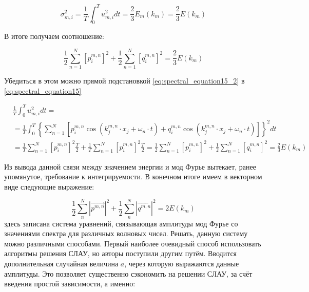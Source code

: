\begin{equation}
    \label{eq:spectral_equation15_2}
    \sigma^2_{m,i} = \frac{1}{T} \int_{0}^{T} u_{m,i}^2 dt = \frac{2}{3} E_m(k_m) = \frac{2}{3} E(k_m) 
\end{equation}

В итоге получаем соотношение:

\begin{equation}
    \label{eq:spectral_equation15_3}
    \frac{1}{2} \sum_{n=1}^N \left[ p_i^{m,n} \right]^2 + \frac{1}{2} \sum_{n=1}^N \left[ q_i^{m,n} \right]^2 = \frac{2}{3} E(k_m) 
\end{equation}

Убедиться в этом можно прямой подстановкой \eqref{eq:spectral_equation15_2} в \eqref{eq:spectral_equation15}

\begin{align}
    & \frac{1}{T} \int_{0}^{T} u_{m,i}^2 dt = \nonumber \\ 
    & = \frac{1}{T} \int_{0}^{T} \left\{ \sum_{n = 1}^{N} \left[ p_{i}^{m,n} \cos{(k_j^{m,n} \cdot x_j + \omega_n \cdot t)} + q_{i}^{m,n} \cos{(k_j^{m,n} \cdot x_j + \omega_n \cdot t)}\right]  \right\}^2 dt                                                                          \nonumber \\
    & = \frac{1}{T} \sum_{n = 1}^{N} \left[p_i^{m,n}\right]^2 \frac{T}{2} + \frac{1}{T} \sum_{n = 1}^{N} \left[p_i^{m,n}\right]^2 \frac{T}{2} = \frac{1}{2} \sum_{n=1}^N \left[ p_i^{m,n} \right]^2 + \frac{1}{2} \sum_{n=1}^N \left[ q_i^{m,n} \right]^2 = \frac{2}{3} E(k_m)
\end{align}

Из вывода данной связи между значением энергии и мод Фурье вытекает, ранее упомянутое, требование к интегрируемости. В конечном итоге имеем в векторном виде следующие выражение:

\begin{equation}
    \label{eq:spectral_equation16}
    \frac{1}{2} \sum_{n}^N |\vec{p^{m,n}}|^2 + \frac{1}{2} \sum_{n}^N |\vec{q^{m,n}}|^2 = 2 E(k_m)
\end{equation}
\noindent
здесь записана система уравнений, связывающая амплитуды мод Фурье со значениями спектра для различных волновых чисел. Решать, данную систему можно различными способами. Первый наиболее очевидный способ использовать алгоритмы решения СЛАУ, но авторы поступили другим путём. Вводится дополнительная случайная величина $a$, через которую выражаются данные амплитуды. Это позволяет существенно сэкономить на решении СЛАУ, за счёт введения простой зависимости, а именно:

